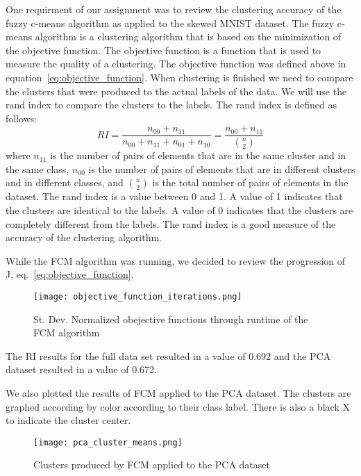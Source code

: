 One requirment of our assignment was to review the clustering accuracy of the fuzzy c-means algorithm as applied to the skewed MNIST dataset.
The fuzzy c-means algorithm is a clustering algorithm that is based on the minimization of the objective function. 
The objective function is a function that is used to measure the quality of a clustering. The objective function was defined above in equation~\ref{eq:objective_function}.
When clustering is finished we need to compare the clusters that were produced to the actual labels of the data. We will use the rand index to compare the clusters to the labels. The rand index is defined as follows:
\begin{equation}
\label{eq:rand_index}
RI = \frac{n_{00} + n_{11}}{n_{00} + n_{11} +n_{01} + n_{10}} = \frac{n_{00} + n_{11}}{{n \choose 2}}
\end{equation}
where $n_{11}$ is the number of pairs of elements that are in the same cluster and in the same class, $n_{00}$ is the number of pairs of elements that are in different clusters and in different classes, and ${n} \choose {2}$ is the total number of pairs of elements in the dataset. 
The rand index is a value between 0 and 1. 
A value of 1 indicates that the clusters are identical to the labels.
A value of 0 indicates that the clusters are completely different from the labels. 
The rand index is a good measure of the accuracy of the clustering algorithm. 

While the FCM algorithm was running, we decided to review the progression of J, eq.~\ref{eq:objective_function}.

\begin{figure}[H]
    \centering
    \texttt{[image: objective\_function\_iterations.png]}
    \caption{St. Dev. Normalized obejective functions through runtime of the FCM algorithm}
    \label{fig:objective_function_iterations}    
\end{figure}

The RI results for the full data set resulted in a value of 0.692 and the PCA dataset resulted in a value of 0.672.

We also plotted the results of FCM applied to the PCA dataset. The clusters are graphed according by color according to their class label. 
There is also a black X to indicate the cluster center.

\begin{figure}[H]
    \centering
    \texttt{[image: pca\_cluster\_means.png]}
    \caption{Clusters produced by FCM applied to the PCA dataset}
    \label{fig:pca_clusters}
\end{figure}






